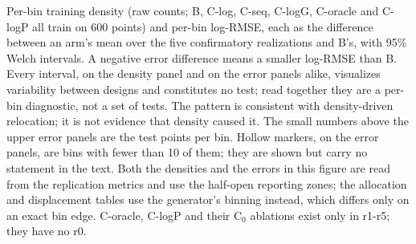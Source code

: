 Per-bin training density (raw counts; B, C-log, C-seq, C-logG, C-oracle and C-logP all train on 600 points) and per-bin log-RMSE, each as the difference between an arm's mean over the five confirmatory realizations and B's, with 95\% Welch intervals. A negative error difference means a smaller log-RMSE than B. Every interval, on the density panel and on the error panels alike, visualizes variability between designs and constitutes no test; read together they are a per-bin diagnostic, not a set of tests. The pattern is consistent with density-driven relocation; it is not evidence that density caused it. The small numbers above the upper error panels are the test points per bin. Hollow markers, on the error panels, are bins with fewer than 10 of them; they are shown but carry no statement in the text. Both the densities and the errors in this figure are read from the replication metrics and use the half-open reporting zones; the allocation and displacement tables use the generator's binning instead, which differs only on an exact bin edge. C-oracle, C-logP and their C$_0$ ablations exist only in r1-r5; they have no r0.
